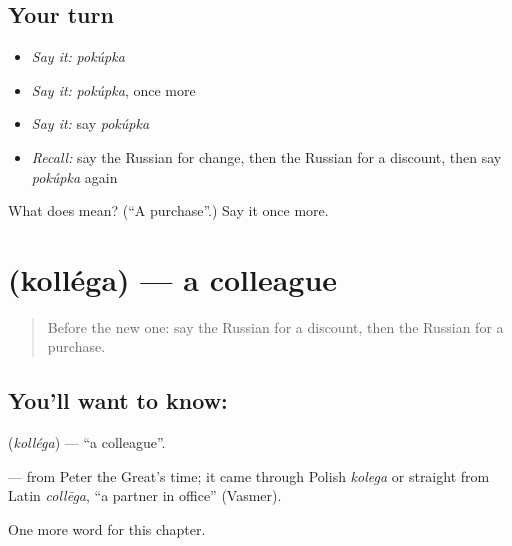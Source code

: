 \subsection*{Your turn}
\begin{itemize}
\raggedright
  \item \emph{Say it:} \emph{pokúpka}
  \item \emph{Say it:} \emph{pokúpka}, once more
  \item \emph{Say it:} say \emph{pokúpka}
  \item \emph{Recall:} say the Russian for change, then the Russian for a discount, then say \emph{pokúpka} again
\end{itemize}

\begin{tcolorbox}[breakable,colback=teal!4,colframe=teal!35!black,title={Before you move on}]
What does  mean? (\textquotedblleft{}A purchase\textquotedblright{}.) Say it once more.
\end{tcolorbox}
\section[\texorpdfstring{\ru{коллега} (kolléga)}{коллега (kolléga)}]{ (kolléga) — a colleague}

\label{lesson:RU-C201-kollega}



\begin{quote}
Before the new one: say the Russian for a discount, then the Russian for a purchase.
\end{quote}

\subsection*{You'll want to know: }
\textbf{} (\emph{kolléga}) — \textquotedblleft{}a colleague\textquotedblright{}.

\begin{cousinweb}
\textbf{} — from Peter the Great's time; it came through Polish \emph{kolega} or straight from Latin \emph{collēga}, \textquotedblleft{}a partner in office\textquotedblright{} (Vasmer).
\end{cousinweb}

\begin{grammarlens}[title={What you've built}]
One more word for this chapter.
\end{grammarlens}

